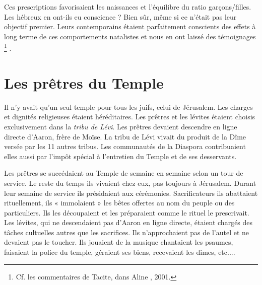  Ces prescriptions favorisaient les naissances et l'équilibre du ratio garçons/filles. Les hébreux en ont-ils eu conscience ? Bien sûr, même si ce n'était pas leur objectif premier. Leurs contemporains étaient parfaitement conscients des effets à long terme de ces comportements natalistes et nous en ont laissé des témoignages%
\footnote{Cf. les commentaires de Tacite, dans Aline , 2001.}%
.

 



 



\section{Les prêtres du Temple}

 Il n'y avait qu'un seul temple pour tous les juifs, celui de Jérusalem. Les charges et dignités religieuses étaient héréditaires. Les prêtres et les lévites étaient choisis exclusivement dans la \emph{tribu de Lévi}. Les prêtres devaient descendre en ligne directe d'Aaron, frère de Moïse. La tribu de Lévi vivait du produit de la Dîme versée par les 11 autres tribus. Les communautés de la Diaspora contribuaient elles aussi par l'impôt spécial  à l'entretien du Temple et de ses desservants. 

 Les prêtres se succédaient au Temple de semaine en semaine selon un tour de service. Le reste du temps ils vivaient chez eux, pas toujours à Jérusalem. Durant leur semaine de service ils présidaient aux cérémonies. Sacrificateurs ils abattaient rituellement, ils « immolaient » les bêtes offertes au nom du peuple ou des particuliers. Ils les découpaient et les préparaient comme le rituel le prescrivait. 
  Les lévites, qui ne descendaient pas d'Aaron en ligne directe, étaient chargés des tâches cultuelles autres que les sacrifices. Ils n'approchaient pas de l'autel et ne devaient pas le toucher. Ils jouaient de la musique chantaient les psaumes, faisaient la police du temple, géraient ses biens, recevaient les dimes, etc....

